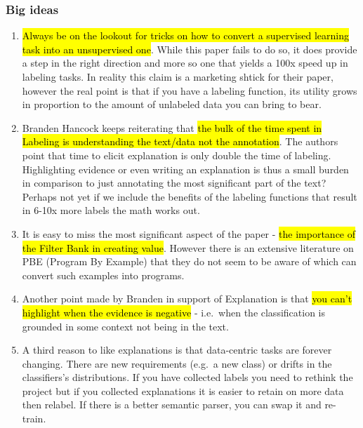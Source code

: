 \documentclass[
  letterpaper,
  DIV=11,
  numbers=noendperiod,
  oneside]{scrartcl}
\providecommand{\tightlist}{%
  \setlength{\itemsep}{0pt}\setlength{\parskip}{0pt}}
\begin{document}
\begin{tcolorbox}[enhanced jigsaw, arc=.35mm, bottomrule=.15mm, bottomtitle=1mm, breakable, colback=white, colbacktitle=quarto-callout-caution-color!10!white, colframe=quarto-callout-caution-color-frame, coltitle=black, left=2mm, leftrule=.75mm, opacityback=0, opacitybacktitle=0.6, rightrule=.15mm, title=\textcolor{quarto-callout-caution-color}{\faFire}\hspace{0.5em}{My Thoughts}, titlerule=0mm, toprule=.15mm, toptitle=1mm]

\subsubsection{Big ideas}\label{big-ideas}

\begin{enumerate}
\def\labelenumi{\arabic{enumi}.}
\tightlist
\item
  \hl{Always be on the lookout for tricks on how to
  convert\footnotemark{} a supervised learning task into an unsupervised
  one}. While this paper fails to do so, it does provide a step in the
  right direction and more so one that yields a 100x speed up in
  labeling tasks. In reality this claim is a marketing shtick for their
  paper, however the real point is that if you have a labeling function,
  its utility grows in proportion to the amount of unlabeled data you
  can bring to bear.
\item
  Branden Hancock keeps reiterating that \hl{the bulk of the time spent
  in Labeling is understanding the text/data not the annotation}. The
  authors point that time to elicit explanation is only double the time
  of labeling. Highlighting evidence or even writing an explanation is
  thus a small burden in comparison to just annotating the most
  significant part of the text? Perhaps not yet if we include the
  benefits of the labeling functions that result in 6-10x more labels
  the math works out.
\item
  It is easy to miss the most significant aspect of the paper - \hl{the
  importance of the Filter Bank in creating value}. However there is an
  extensive literature on PBE (Program By Example) that they do not seem
  to be aware of which can convert such examples into programs.
\item
  Another point made by Branden in support of Explanation is that
  \hl{you can't highlight when the evidence is negative} - i.e.~when the
  classification is grounded in some context not being in the text.
\item
  A third reason to like explanations is that data-centric tasks are
  forever changing. There are new requirements (e.g.~a new class) or
  drifts in the classifiers's distributions. If you have collected
  labels you need to rethink the project but if you collected
  explanations it is easier to retain on more data then relabel. If
  there is a better semantic parser, you can swap it and re-train.
\end{enumerate}


\end{tcolorbox}
\end{document}
